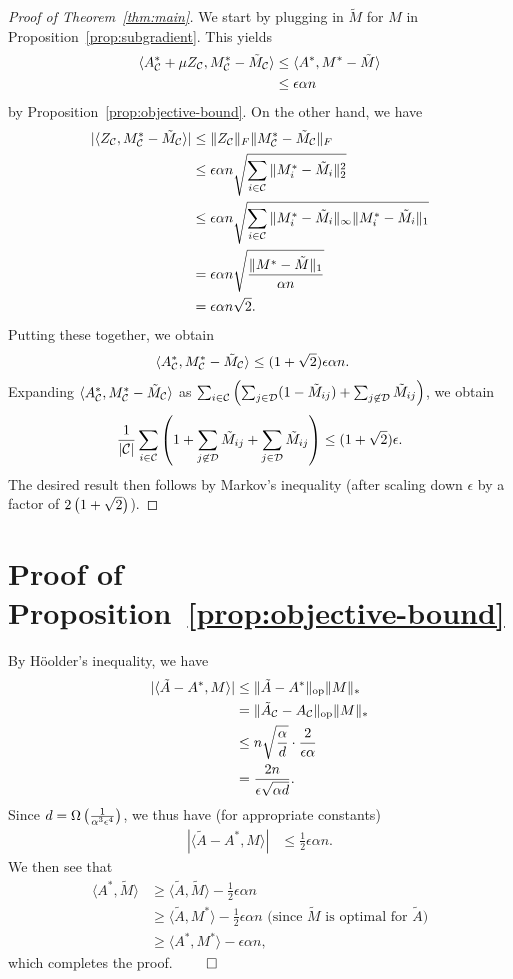 \documentclass[11pt]{article}
\newcommand{\M}{\tilde{M}}
\newcommand{\Mm}{M^*}
\newcommand{\A}{\tilde{A}}
\newcommand{\Aa}{A^*}
\newcommand{\sD}{\mathcal{D}}
\begin{document}
\begin{proof}[Proof of Theorem~\ref{thm:main}]
We start by plugging in $\M$ for $M$ in Proposition~\ref{prop:subgradient}. This yields
\begin{align}
\langle \Aa_{\sC} + \mu Z_{\sC}, \Mm_{\sC} - \M_{\sC} \rangle &\leq \langle \Aa, \Mm - \M \rangle \\
 &\leq \epsilon \alpha n
\end{align}
by Proposition~\ref{prop:objective-bound}.
On the other hand, we have 
\begin{align}
|\langle Z_{\sC}, \Mm_{\sC} - \M_{\sC} \rangle| &\leq \|Z_{\sC}\|_F\|\Mm_{\sC} - \M_{\sC}\|_F \\
 &\leq \epsilon\alpha n \sqrt{\sum_{i \in \sC} \|\Mm_i - \M_i\|_2^2} \\
 &\leq \epsilon\alpha n \sqrt{\sum_{i \in \sC} \|\Mm_i - \M_i\|_{\infty}\|\Mm_i - \M_i\|_1} \\
 &= \epsilon\alpha n \sqrt{\frac{\|\Mm-\M\|_1}{\alpha n}} \\
 &= \epsilon\alpha n \sqrt{2}.
\end{align}
Putting these together, we obtain
\begin{align}
\langle \Aa_{\sC}, \Mm_{\sC} - \M_{\sC} \rangle &\leq (1+\sqrt{2})\epsilon \alpha n.
\end{align}
Expanding $\langle \Aa_{\sC}, \Mm_{\sC} - \M_{\sC} \rangle$ as 
$\sum_{i \in \sC}\p{\sum_{j \in \sD} (1 - \M_{ij}) + \sum_{j \not\in \sD} \M_{ij}}$, 
we obtain 
\[ \frac{1}{|\sC|}\sum_{i \in \sC}\p{1 + \sum_{j\not\in \sD} \M_{ij} + \sum_{j \in \sD} \M_{ij}} \leq (1+\sqrt{2})\epsilon. \]
The desired result then follows by Markov's inequality (after scaling down $\epsilon$ by a factor of $2\left(1+\sqrt{2}\right)$).
\end{proof}

\section{Proof of Proposition~\ref{prop:objective-bound}}
By H\"{o}older's inequality, we have 
\begin{align}
|\langle \A-\Aa, M \rangle| &\leq \|\A-\Aa\|_{\op}\|M\|_* \\
 &= \|\A_{\sC}-A_{\sC}\|_{\op}\|M\|_* \\
 &\leq n\sqrt{\frac{\alpha}{d}} \cdot \frac{2}{\epsilon\alpha} \\
 &= \frac{2n}{\epsilon\sqrt{\alpha d}}.
\end{align}
Since $d = \Omega\left(\frac{1}{\alpha^3\epsilon^4}\right)$, we thus have (for appropriate constants)
\begin{align}
|\langle \A-\Aa, M \rangle| &\leq \frac{1}{2}\epsilon \alpha n.
\end{align}
We then see that
\begin{align}
\langle \Aa, \M \rangle  &\geq \langle \A, \M \rangle - \frac{1}{2}\epsilon \alpha n \\
 &\geq \langle \A, \Mm \rangle - \frac{1}{2} \epsilon \alpha n \text{ (since $\M$ is optimal for $\A$)} \\
 &\geq \langle \Aa, \Mm \rangle - \epsilon \alpha n,
\end{align}
which completes the proof. $\qed$
\end{document}
